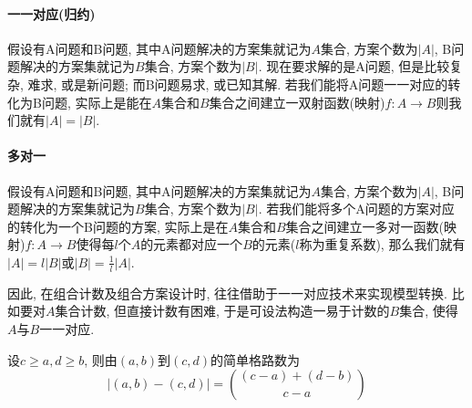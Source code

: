     \paragraph{一一对应(归约)}

        假设有A问题和B问题, 其中A问题解决的方案集就记为$A$集合, 方案个数为$|A|$,  B问题解决的方案集就记为$B$集合, 方案个数为$|B|$. 现在要求解的是A问题, 但是比较复杂, 难求, 或是新问题; 而B问题易求, 或已知其解. 若我们能将A问题一一对应的转化为B问题, 实际上是能在$A$集合和$B$集合之间建立一双射函数(映射)$f:A\to B$则我们就有$|A|=|B|$. 

    \paragraph{多对一}

        假设有A问题和B问题, 其中A问题解决的方案集就记为$A$集合, 方案个数为$|A|$,  B问题解决的方案集就记为$B$集合, 方案个数为$|B|$. 若我们能将多个A问题的方案对应的转化为一个B问题的方案, 实际上是在$A$集合和$B$集合之间建立一\textsf{多对一函数}(映射)$f:A\to B$使得每$l$个$A$的元素都对应一个$B$的元素($l$称为\textsf{重复系数}), 那么我们就有$|A|=l|B|$或$|B|=\frac{1}{l}|A|$.

    因此, 在组合计数及组合方案设计时, 往往借助于一一对应技术来实现模型转换. 比如要对$A$集合计数, 但直接计数有困难, 于是可设法构造一易于计数的$B$集合, 使得$A$与$B$一一对应. 

    \begin{theorem}[格路定理]\rm
        设$c\geqslant a, d\geqslant b$, 则由$(a,b)$到$(c,d)$的简单\textsf{格路数}为
        \[\left|(a,b)-(c,d)\right|={(c-a)+(d-b)\choose c-a}\]
    \end{theorem}

